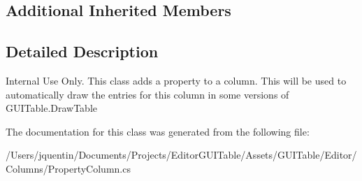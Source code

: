 \subsection*{Additional Inherited Members}


\subsection{Detailed Description}
Internal Use Only. This class adds a property to a column. This will be used to automatically draw the entries for this column in some versions of G\+U\+I\+Table.\+Draw\+Table 



The documentation for this class was generated from the following file\+:\begin{DoxyCompactItemize}
\item 
/\+Users/jquentin/\+Documents/\+Projects/\+Editor\+G\+U\+I\+Table/\+Assets/\+G\+U\+I\+Table/\+Editor/\+Columns/Property\+Column.\+cs\end{DoxyCompactItemize}
